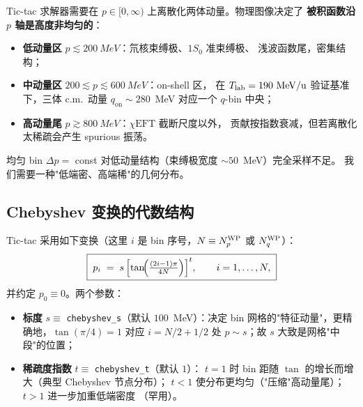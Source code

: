 Tic-tac 求解器需要在 $p\in[0,\infty)$ 上离散化两体动量。物理图像决定了
\textbf{被积函数沿 $p$ 轴是高度非均匀的}：
\begin{itemize}
\item \textbf{低动量区} $p\lesssim 200~\si{MeV}$：氘核束缚极、$1S_0$ 准束缚极、
      浅波函数尾，密集结构；
\item \textbf{中动量区} $200\lesssim p\lesssim 600~\si{MeV}$：on-shell 区，
      在 $\Tlab=190~\si{MeV/u}$ 验证基准下，三体 c.m.\ 动量 $q_{\text{on}}\sim 280$~MeV
      对应一个 $q$-bin 中央；
\item \textbf{高动量尾} $p\gtrsim 800~\si{MeV}$：$\chi\text{EFT}$ 截断尺度以外，
      贡献按指数衰减，但若离散化太稀疏会产生 spurious 振荡。
\end{itemize}
均匀 bin $\Delta p=$ const 对低动量结构（束缚极宽度 $\sim 50$~MeV）完全采样不足。
我们需要一种"低端密、高端稀"的几何分布。

\subsection{Chebyshev 变换的代数结构}
\label{sec:appC:cheb_alg}

Tic-tac 采用如下变换（这里 $i$ 是 bin 序号，$N\equiv\NpWP$ 或 $\NqWP$）：
\begin{equation}
  \boxed{\;
    p_i \;=\; s\,\Bigl[\tan\!\Bigl(\tfrac{(2i-1)\pi}{4N}\Bigr)\Bigr]^{t},
    \qquad i=1,\dots,N,
  \;}
  \label{eq:appC:cheb_def}
\end{equation}
并约定 $p_0\equiv 0$。两个参数：
\begin{itemize}
\item \textbf{标度} $s\equiv$ \texttt{chebyshev\_s}（默认 $100$~MeV）：决定
      bin 网格的"特征动量"，更精确地，$\tan(\pi/4)=1$ 对应 $i=N/2+1/2$ 处
      $p\sim s$；故 $s$ 大致是网格"中段"的位置；
\item \textbf{稀疏度指数} $t\equiv$ \texttt{chebyshev\_t}（默认 $1$）：
      $t=1$ 时 bin 距随 $\tan$ 的增长而增大（典型 Chebyshev 节点分布）；
      $t<1$ 使分布更均匀（"压缩"高动量尾）；$t>1$ 进一步加重低端密度
      （罕用）。
\end{itemize}

